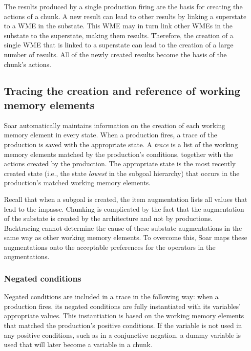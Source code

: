 
The results produced by a single production firing are the basis for creating
the actions of a chunk. A new result can lead to other results by linking a
superstate to a WME in the substate. This WME may in turn link
other WMEs in the substate to the superstate, making them results.
Therefore, the creation of a single WME that is linked to a superstate
can lead to the creation of a large number of results. All of the newly
created results become the basis of the chunk's actions.

\subsection{Tracing the creation and reference of working memory elements} 

Soar automatically maintains information on the creation of each 
working memory element in every state.  When a production fires, a
trace of the production is saved with the appropriate state. A \emph{trace} is
a list of the working memory elements matched by the production's conditions,
together with the actions created by the production.  The appropriate state
is the most recently created state (i.e., the state \emph{lowest} in the
subgoal hierarchy) that occurs in the production's matched working memory
elements.

Recall that when a subgoal is created, the \carat item augmentation lists all
values that lead to the impasse.
Chunking is complicated by the fact that the  augmentation
of the substate is created by the architecture and not by productions.
Backtracing cannot determine the cause of these substate augmentations in the
same way as other working memory elements. To overcome this, Soar maps these
augmentations onto the acceptable preferences for the operators in the 
 augmentations.


\subsubsection*{Negated conditions}

Negated conditions are included in a trace in the following way: when a
production fires, its negated conditions are fully instantiated with its
variables' appropriate values. This instantiation is based on the working
memory elements that matched the production's positive conditions. If the
variable is not used in any positive conditions, such as in a conjunctive
negation, a dummy variable is used that will later become a variable in a
chunk.


